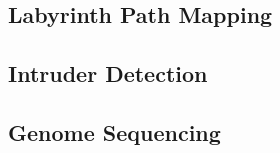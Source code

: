 \subsection{Labyrinth Path Mapping}
\label{sec:experiments:labyrinth}

\subsection{Intruder Detection}
\label{sec:experiments:intruder}

\subsection{Genome Sequencing}
\label{sec:experiments:genome}



